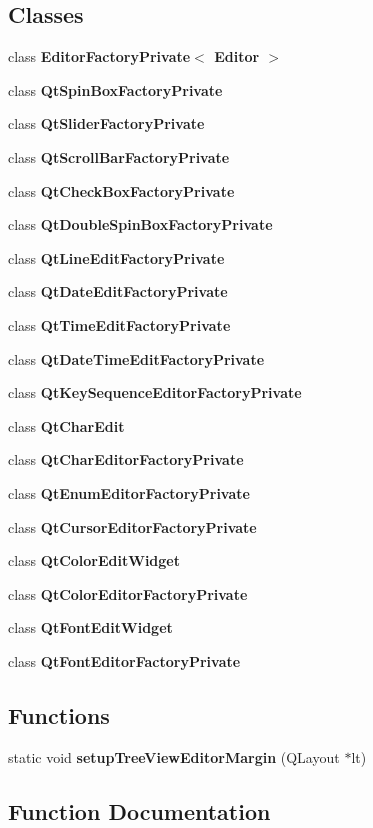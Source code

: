 \subsection*{Classes}
\begin{DoxyCompactItemize}
\item 
class {\bf Editor\+Factory\+Private$<$ Editor $>$}
\item 
class {\bf Qt\+Spin\+Box\+Factory\+Private}
\item 
class {\bf Qt\+Slider\+Factory\+Private}
\item 
class {\bf Qt\+Scroll\+Bar\+Factory\+Private}
\item 
class {\bf Qt\+Check\+Box\+Factory\+Private}
\item 
class {\bf Qt\+Double\+Spin\+Box\+Factory\+Private}
\item 
class {\bf Qt\+Line\+Edit\+Factory\+Private}
\item 
class {\bf Qt\+Date\+Edit\+Factory\+Private}
\item 
class {\bf Qt\+Time\+Edit\+Factory\+Private}
\item 
class {\bf Qt\+Date\+Time\+Edit\+Factory\+Private}
\item 
class {\bf Qt\+Key\+Sequence\+Editor\+Factory\+Private}
\item 
class {\bf Qt\+Char\+Edit}
\item 
class {\bf Qt\+Char\+Editor\+Factory\+Private}
\item 
class {\bf Qt\+Enum\+Editor\+Factory\+Private}
\item 
class {\bf Qt\+Cursor\+Editor\+Factory\+Private}
\item 
class {\bf Qt\+Color\+Edit\+Widget}
\item 
class {\bf Qt\+Color\+Editor\+Factory\+Private}
\item 
class {\bf Qt\+Font\+Edit\+Widget}
\item 
class {\bf Qt\+Font\+Editor\+Factory\+Private}
\end{DoxyCompactItemize}
\subsection*{Functions}
\begin{DoxyCompactItemize}
\item 
static void {\bf setup\+Tree\+View\+Editor\+Margin} (Q\+Layout $\ast$lt)
\end{DoxyCompactItemize}


\subsection{Function Documentation}
